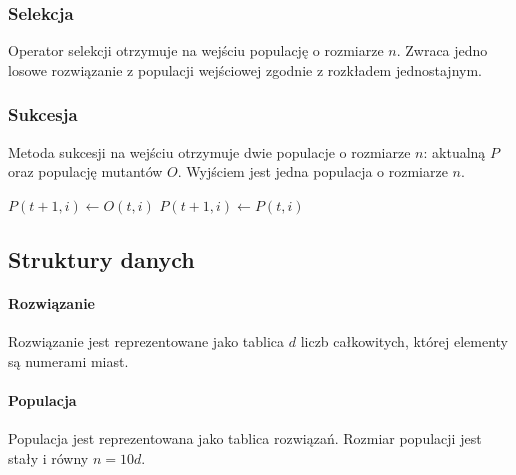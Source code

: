 \documentclass[12pt, a4paper]{article}
\begin{document}
\subsubsection{Selekcja}

Operator selekcji otrzymuje na wejściu populację o rozmiarze $n$. Zwraca jedno losowe rozwiązanie z populacji wejściowej
zgodnie z rozkładem jednostajnym.

\subsubsection{Sukcesja}

Metoda sukcesji na wejściu otrzymuje dwie populacje o rozmiarze $n$: aktualną $P$ oraz populację mutantów $O$.
Wyjściem jest jedna populacja o rozmiarze $n$.

\begin{algorithm}[!htb]
\begin{algorithmic}[1]
      \State $P(t+1, i) \gets O(t, i)$
    \Else
      \State $P(t+1, i) \gets P(t, i)$
    \EndIf
  \EndFor
\EndFunction
\end{algorithmic}
\end{algorithm}

\subsection{Struktury danych}
	\paragraph{Rozwiązanie}
		Rozwiązanie jest reprezentowane jako tablica $d$ liczb całkowitych, której elementy są numerami miast.
	\paragraph{Populacja}
		Populacja jest reprezentowana jako tablica rozwiązań. Rozmiar populacji jest stały i równy $n = 10d$.
\end{document}
